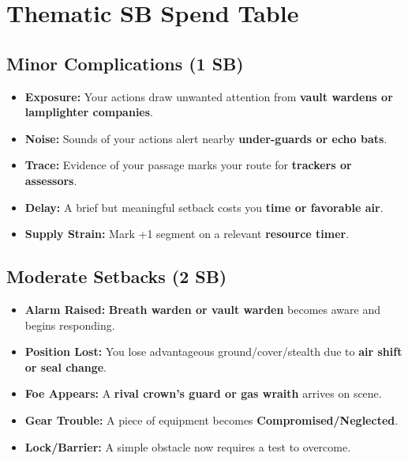 \section*{Thematic SB Spend Table}
\label{sec:aeler-sb}

\subsection*{Minor Complications (1 SB)}
\begin{itemize}
\item \textbf{Exposure:} Your actions draw unwanted attention from \textbf{vault wardens or lamplighter companies}.
\item \textbf{Noise:} Sounds of your actions alert nearby \textbf{under-guards or echo bats}.
\item \textbf{Trace:} Evidence of your passage marks your route for \textbf{trackers or assessors}.
\item \textbf{Delay:} A brief but meaningful setback costs you \textbf{time or favorable air}.
\item \textbf{Supply Strain:} Mark +1 segment on a relevant \textbf{resource timer}.
\end{itemize}

\subsection*{Moderate Setbacks (2 SB)}
\begin{itemize}
\item \textbf{Alarm Raised:} \textbf{Breath warden or vault warden} becomes aware and begins responding.
\item \textbf{Position Lost:} You lose advantageous ground/cover/stealth due to \textbf{air shift or seal change}.
\item \textbf{Foe Appears:} A \textbf{rival crown's guard or gas wraith} arrives on scene.
\item \textbf{Gear Trouble:} A piece of equipment becomes \textbf{Compromised/Neglected}.
\item \textbf{Lock/Barrier:} A simple obstacle now requires a test to overcome.
\end{itemize}

